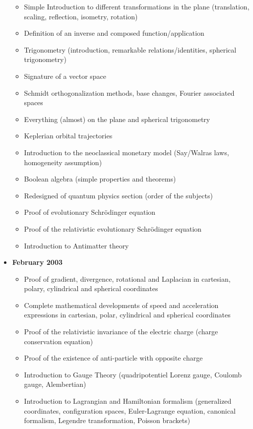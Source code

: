 \documentclass[12pt,a4paper,twoside,openright]{report}
\theoremstyle{definition}
\theoremstyle{itexmp}
\numberwithin{equation}{section}
\begin{document}
\begin{itemize}
\begin{itemize}[noitemsep]
			\item Simple Introduction to different transformations in the plane (translation, scaling, reflection, isometry, rotation)
			\item Definition of an inverse and composed function/application
			\item Trigonometry (introduction, remarkable relations/identities, spherical trigonometry)
			\item Signature of a vector space
			\item Schmidt orthogonalization methods, base changes, Fourier associated spaces
			\item Everything (almost) on the plane and spherical trigonometry
			\item Keplerian orbital trajectories
			\item Introduction to the neoclassical monetary model (Say/Walras laws, homogeneity assumption)
			\item Boolean algebra (simple properties and theorems)
			\item Redesigned of quantum physics section (order of the subjects)
			\item Proof of evolutionary Schrödinger  equation
			\item Proof of the relativistic evolutionary Schrödinger equation
			\item Introduction to Antimatter theory
		\end{itemize}
	\item \textbf{February 2003}
			\begin{itemize}[noitemsep]
			\item Proof of gradient, divergence, rotational and Laplacian in cartesian, polary, cylindrical and spherical coordinates
			\item Complete mathematical developments of speed and acceleration expressions in cartesian, polar, cylindrical and spherical coordinates 
			\item Proof  of the relativistic invariance of the electric charge (charge conservation equation) 
			\item Proof of the existence of anti-particle  with opposite charge 
			\item Introduction to Gauge Theory (quadripotentiel Lorenz gauge, Coulomb gauge, Alembertian) 
			\item Introduction to Lagrangian and Hamiltonian formalism (generalized coordinates, configuration spaces, Euler-Lagrange equation, canonical formalism, Legendre transformation, Poisson brackets) 

\end{itemize}
\end{itemize}
\end{document}
